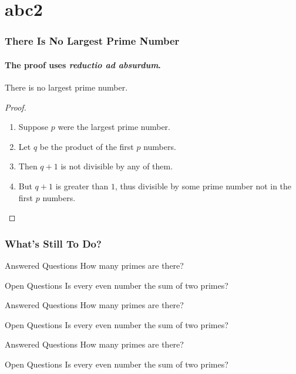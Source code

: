 \documentclass[xcolor=dvipsnames]{beamer}
\begin{document}
\section{abc2}
\begin{frame}
\frametitle{There Is No Largest Prime Number}
\framesubtitle{The proof uses \textit{reductio ad absurdum}.}
\begin{theorem}
There is no largest prime number.
\end{theorem}
\begin{proof}
\begin{enumerate}
\item<1-> Suppose $p$ were the largest prime number.
\item<2-> Let $q$ be the product of the first $p$ numbers.
\item<3-> Then $q + 1$ is not divisible by any of them.
\item<1-> But $q + 1$ is greater than $1$, thus divisible by some prime
number not in the first $p$ numbers.\qedhere
\end{enumerate}
\end{proof}
\end{frame}

\begin{frame}
\frametitle{What’s Still To Do?}
\begin{block}{Answered Questions}
How many primes are there?
\end{block}
\begin{block}{Open Questions}
Is every even number the sum of two primes?
\end{block}
\begin{block}{Answered Questions}
How many primes are there?
\end{block}
\begin{block}{Open Questions}
Is every even number the sum of two primes?
\end{block}
\begin{block}{Answered Questions}
How many primes are there?
\end{block}
\begin{block}{Open Questions}
Is every even number the sum of two primes?
\end{block}
\end{frame}
\end{document}
